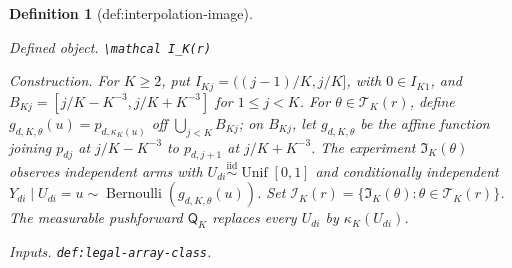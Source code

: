 \documentclass{article}
\newtheorem{definition}{Definition}
\begin{document}
\begin{definition}[def:interpolation-image]\label{def:interpolation-image}
\par\smallskip\noindent\emph{Defined object.} \texttt{\textbackslash{}\allowbreak{}mathcal I\_\allowbreak{}K(r)}
\par\smallskip\noindent\emph{Construction.} For \(K\ge2\), put \(I_{Kj}=((j-1)/K,j/K]\), with \(0\in I_{K1}\), and \(B_{Kj}=[j/K-K^{-3},j/K+K^{-3}]\) for \(1\le j<K\). For \(\theta\in\mathcal T_K(r)\), define \(g_{d,K,\theta}(u)=p_{d,\kappa_K(u)}\) off \(\bigcup_{j<K}B_{Kj}\); on \(B_{Kj}\), let \(g_{d,K,\theta}\) be the affine function joining \(p_{dj}\) at \(j/K-K^{-3}\) to \(p_{d,j+1}\) at \(j/K+K^{-3}\). The experiment \(\mathfrak I_K(\theta)\) observes independent arms with \(U_{di}\stackrel{\mathrm{iid}}{\sim}\operatorname{Unif}[0,1]\) and conditionally independent \(Y_{di}\mid U_{di}=u\sim\operatorname{Bernoulli}(g_{d,K,\theta}(u))\). Set \(\mathcal I_K(r)=\{\mathfrak I_K(\theta):\theta\in\mathcal T_K(r)\}\). The measurable pushforward \(\mathsf Q_K\) replaces every \(U_{di}\) by \(\kappa_K(U_{di})\).
\par\smallskip\noindent\emph{Inputs.} \texttt{def:\allowbreak{}legal-\allowbreak{}array-\allowbreak{}class}.
\end{definition}
\end{document}
